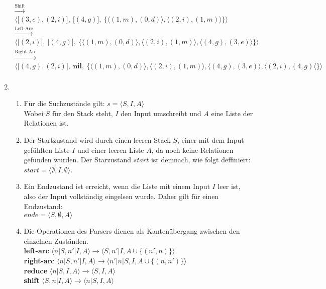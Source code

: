 \documentclass[a4paper]{scrartcl}
\begin{document}
\begin{enumerate}
\begin{gather*}
            \xrightarrow{\text{Shift}} \\
            \Big\langle \big[ (3, e), (2, i) \big],\ 
            \big[ (4, g) \big],\ 
            \big\{ \langle (1, m), (0, d) \rangle,
                   \langle (2, i), (1, m) \rangle
            \big \} \Big \rangle \\
            \xrightarrow{\text{Left-Arc}} \\
            \Big\langle \big[ (2, i) \big],\ 
            \big[ (4, g) \big],\ 
            \big\{ \langle (1, m), (0, d) \rangle,
                   \langle (2, i), (1, m) \rangle, 
                   \langle (4, g), (3, e) \rangle
            \big\} \Big\rangle \\
            \xrightarrow{\text{Right-Arc}} \\
            \Big\langle \big[ (4, g), (2, i) \big],\
            \mathbf{nil},\ 
            \big\{ \langle (1, m), (0, d) \rangle,
                   \langle (2, i), (1, m) \rangle,
                   \langle (4, g), (3, e) \rangle,
                   \langle (2, i), (4, g) \langle
            \big\} \Big\rangle \\
        \end{gather*}
\newpage
    \item
		\begin{enumerate}
			\item
				Für die Suchzustände gilt: $s = \langle S,I,A \rangle$ \\
				Wobei $S$ für den Stack steht, $I$ den Input umschreibt und $A$ eine Liste der Relationen 
				ist.
				
			\item
				Der Startzustand wird durch einen leeren Stack $S$, einer mit dem Input gefühlten Liste
				$I$ und einer leeren Liste $A$, da noch keine Relationen gefunden wurden. Der Starzustand 
				$start$ ist demnach, wie folgt deffiniert: \\ 
				$start = \langle \emptyset,I,\emptyset \rangle$.
				
			\item
				Ein Endzustand ist erreicht, wenn die Liste mit einem Input $I$ leer ist, also der Input 
				vollständig eingelsen wurde. Daher gilt für einen Endzustand: \\ 
				$ende = \langle S,\emptyset,A \rangle$
				
			\item
				Die Operationen des Parsers dienen als Kantenübergang zwischen den einzelnen Zuständen. \\
	            \textbf{left-arc}   $\langle n|S,n'|I,A\rangle \rightarrow \langle S,n'|I,A \cup \{(n',n)\}\rangle$ \\
	            \textbf{right-arc} $\langle n |S, n' | I, A \rangle \rightarrow \langle n'|n|S, I, A \cup \{(n, n')\}\rangle$ \\
	            \textbf{reduce} $\langle n|S,I,A\rangle \rightarrow \langle S,I,A \rangle$ \\
	            \textbf{shift} $\langle S,n|I,A\rangle \rightarrow \langle n|S,I,A \rangle$ \\
				

\end{enumerate}
\end{enumerate}
\end{document}
